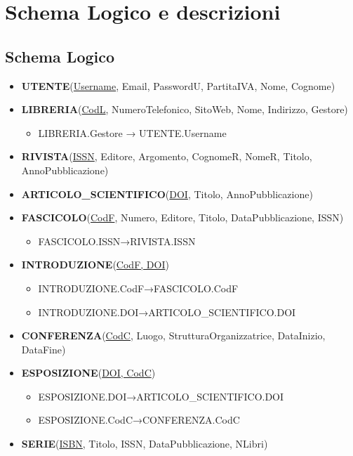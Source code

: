 \documentclass{article}
\begin{document}
\newpage
\section{Schema Logico e descrizioni}
\subsection{Schema Logico}
\begin{itemize} 
    \item \textbf{UTENTE}(\underline{Username}, Email, PasswordU, PartitaIVA, Nome, Cognome)
    \item \textbf{LIBRERIA}(\underline{CodL}, NumeroTelefonico, SitoWeb, Nome, Indirizzo, Gestore)
        \begin{itemize}
            \item LIBRERIA.Gestore → UTENTE.Username
        \end{itemize}
    \item \textbf{RIVISTA}(\underline{ISSN}, Editore, Argomento, CognomeR, NomeR, Titolo, AnnoPubblicazione)
    \item \textbf{ARTICOLO\_SCIENTIFICO}(\underline{DOI}, Titolo, AnnoPubblicazione)
    \item \textbf{FASCICOLO}(\underline{CodF}, Numero, Editore, Titolo, DataPubblicazione, ISSN)
        \begin{itemize}
	       \item FASCICOLO.ISSN→RIVISTA.ISSN
        \end{itemize}
    \item \textbf{INTRODUZIONE}(\underline{CodF, DOI})
        \begin{itemize}
	       \item INTRODUZIONE.CodF→FASCICOLO.CodF          
	       \item INTRODUZIONE.DOI→ARTICOLO\_SCIENTIFICO.DOI
        \end{itemize}
    \item \textbf{CONFERENZA}(\underline{CodC}, Luogo, StrutturaOrganizzatrice, DataInizio, DataFine)
    \item \textbf{ESPOSIZIONE}(\underline{DOI, CodC})
        \begin{itemize}
	       \item ESPOSIZIONE.DOI→ARTICOLO\_SCIENTIFICO.DOI
	       \item ESPOSIZIONE.CodC→CONFERENZA.CodC
        \end{itemize}
    \item \textbf{SERIE}(\underline{ISBN}, Titolo, ISSN, DataPubblicazione, NLibri)

\end{itemize}
\end{document}

